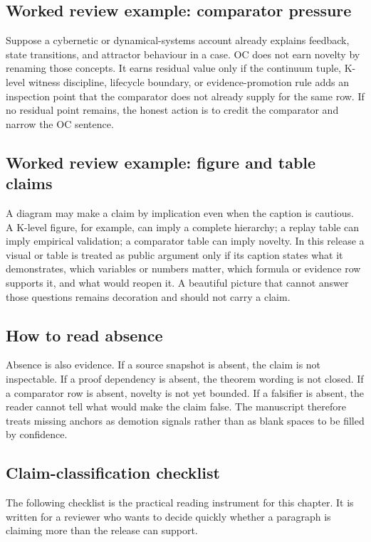 \subsection{Worked review example: comparator pressure}

Suppose a cybernetic or dynamical-systems account already explains feedback,
state transitions, and attractor behaviour in a case. OC does not earn novelty
by renaming those concepts. It earns residual value only if the continuum tuple,
K-level witness discipline, lifecycle boundary, or evidence-promotion rule
adds an inspection point that the comparator does not already supply for the
same row. If no residual point remains, the honest action is to credit the
comparator and narrow the OC sentence.

\subsection{Worked review example: figure and table claims}

A diagram may make a claim by implication even when the caption is cautious. A
K-level figure, for example, can imply a complete hierarchy; a replay table can
imply empirical validation; a comparator table can imply novelty. In this
release a visual or table is treated as public argument only if its caption
states what it demonstrates, which variables or numbers matter, which formula
or evidence row supports it, and what would reopen it. A beautiful picture that
cannot answer those questions remains decoration and should not carry a claim.

\subsection{How to read absence}

Absence is also evidence. If a source snapshot is absent, the claim is not
inspectable. If a proof dependency is absent, the theorem wording is not
closed. If a comparator row is absent, novelty is not yet bounded. If a
falsifier is absent, the reader cannot tell what would make the claim false.
The manuscript therefore treats missing anchors as demotion signals rather than
as blank spaces to be filled by confidence.

\subsection{Claim-classification checklist}

The following checklist is the practical reading instrument for this chapter.
It is written for a reviewer who wants to decide quickly whether a paragraph is
claiming more than the release can support.

